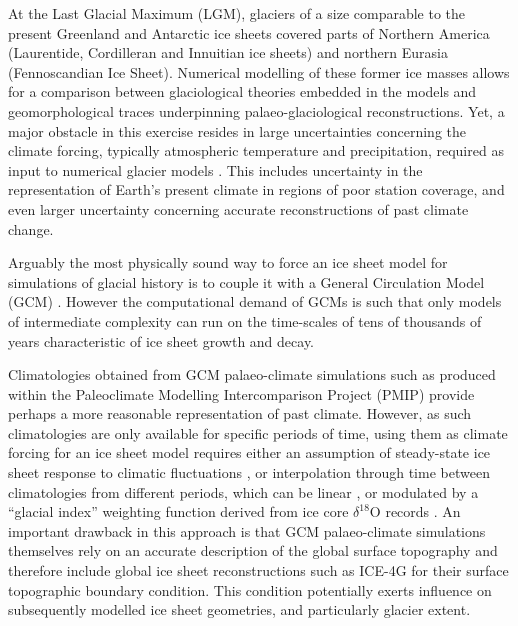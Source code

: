\introduction
\label{sec:intro}

At the Last Glacial Maximum (LGM), glaciers of a size comparable to the present Greenland and Antarctic ice sheets covered parts of Northern America (Laurentide, Cordilleran and Innuitian ice sheets) and northern Eurasia (Fennoscandian Ice Sheet). Numerical modelling of these former ice masses allows for a comparison between glaciological theories embedded in the models and geomorphological traces underpinning palaeo-glaciological reconstructions. Yet, a major obstacle in this exercise resides in large uncertainties concerning the climate forcing, typically atmospheric temperature and precipitation, required as input to numerical glacier models \citep{hebeler-etal-2008}. This includes uncertainty in the representation of Earth's present climate in regions of poor station coverage, and even larger uncertainty concerning accurate reconstructions of past climate change.

Arguably the most physically sound way to force an ice sheet model for simulations of glacial history is to couple it with a General Circulation Model (GCM) \citep{yoshimori-etal-2001,calov-etal-2002,abeouchi-etal-2007,charbit-etal-2013}. However the computational demand of GCMs is such that only models of intermediate complexity can run on the time-scales of tens of thousands of years characteristic of ice sheet growth and decay.

Climatologies obtained from GCM palaeo-climate simulations such as produced within the Paleoclimate Modelling Intercomparison Project (PMIP) \citep{joussaume-taylor-1995} provide perhaps a more reasonable representation of past climate. However, as such climatologies are only available for specific periods of time, using them as climate forcing for an ice sheet model requires either an assumption of steady-state ice sheet response to climatic fluctuations \citep{huybrechts-tsiobbel-1996}, or interpolation through time between climatologies from different periods, which can be linear \citep{charbit-etal-2002}, or modulated by a ``glacial index'' weighting function derived from ice core $\delta^{18}$O records \citep{marshall-clarke-1999,tarasov-peltier-2004,zweck-huybrechts-2005,gregoire-etal-2012}. An important drawback in this approach is that GCM palaeo-climate simulations themselves rely on an accurate description of the global surface topography and therefore include global ice sheet reconstructions such as ICE-4G \citep{peltier-1994} for their surface topographic boundary condition. This condition potentially exerts influence on subsequently modelled ice sheet geometries, and particularly glacier extent.

